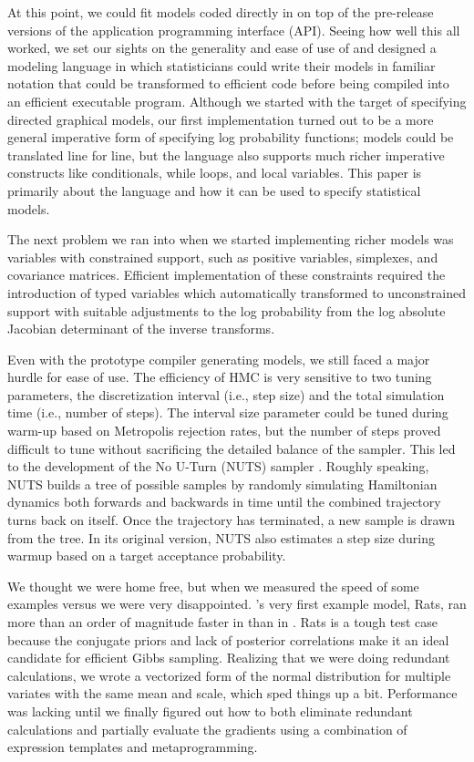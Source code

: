 \documentclass[article]{jss}
\begin{document}
At this point, we could fit models coded directly in  on
top of the pre-release versions of the  application
programming interface (API).  Seeing how well this all worked, we set
our sights on the generality and ease of use of  and
designed a modeling language in which statisticians could write their
models in familiar notation that could be transformed to efficient
 code before being compiled into an efficient executable
program.  Although we started with the target of specifying directed
graphical models, our first implementation turned out to be a more
general imperative form of specifying log probability functions;
 models could be translated line for line, but the
 language also supports much richer imperative
constructs like conditionals, while loops, and local variables.  This
paper is primarily about the  language and how it can
be used to specify statistical models.
 
The next problem we ran into when we started implementing richer
models was variables with constrained support, such as positive variables, 
simplexes, and covariance matrices.  
Efficient implementation of these constraints
required the introduction of typed variables which automatically transformed to
unconstrained support with suitable adjustments to the log probability
from the log absolute Jacobian determinant of the inverse transforms.

Even with the prototype compiler generating models, we still faced a
major hurdle for ease of use. The efficiency of HMC is very sensitive
to two tuning parameters, the discretization interval (i.e., step
size) and the total simulation time (i.e., number of steps).  The
interval size parameter could be tuned during warm-up based on
Metropolis rejection rates, but the number of steps proved difficult
to tune without sacrificing the detailed balance of the sampler.  This
led to the development of the No U-Turn (NUTS) sampler
\citep{HoffmanGelman:2011}.  Roughly speaking, NUTS builds a tree of
possible samples by randomly simulating Hamiltonian dynamics both
forwards and backwards in time until the combined trajectory turns
back on itself.  Once the trajectory has terminated, a new sample is
drawn from the tree.  In its original version, NUTS also estimates a
step size during warmup based on a target acceptance probability. 

We thought we were home free, but when we measured the
speed of some  examples versus  we were
very disappointed.  's very first example model, Rats,
ran more than an order of magnitude faster in  than in
.  Rats is a tough test case because the conjugate
priors and lack of posterior correlations make it an ideal candidate
for efficient Gibbs sampling.  Realizing that we were doing redundant
calculations, we wrote a vectorized form of the normal distribution
for multiple variates with the same mean and scale, which sped things
up a bit.  Performance was lacking until we finally figured out how
to both eliminate redundant calculations and partially evaluate the
gradients using a combination of expression templates and
metaprogramming.
\end{document}
